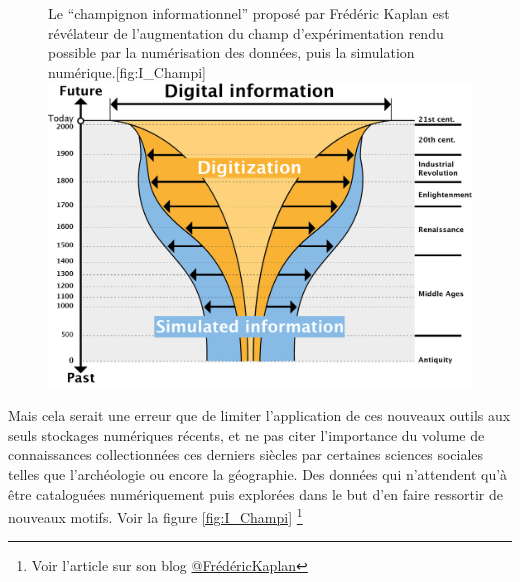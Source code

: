 \begin{figure}[!h]
\begin{sidecaption}[fortoc]{Le \enquote{champignon informationnel} proposé par Frédéric Kaplan est révélateur de l'augmentation du champ d'expérimentation rendu possible par la numérisation des données, puis la simulation numérique.}[fig:I_Champi]
 \centering
 \includegraphics[width=\linewidth]{champignonKaplan.png}
  \end{sidecaption}
\end{figure}

Mais cela serait une erreur que de limiter l'application de ces nouveaux outils aux seuls stockages numériques récents, et ne pas citer l'importance du volume de connaissances collectionnées ces derniers siècles par certaines sciences sociales telles que l'archéologie ou encore la géographie. Des données qui n'attendent qu'à être cataloguées numériquement puis explorées dans le but d'en faire ressortir de nouveaux motifs. Voir la figure \ref{fig:I_Champi} \footnote{Voir l'article sur son blog \href{http://fkaplan.wordpress.com/2013/03/14/lancement-de-la-venice-time-machine/}{@FrédéricKaplan}}


